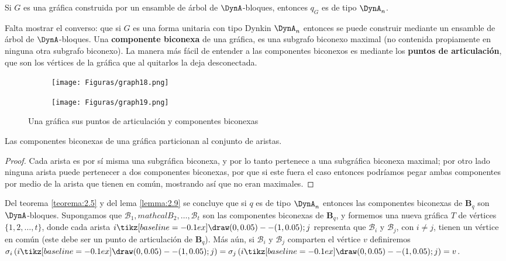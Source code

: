 \begin{lemma}
Si $G$ es una gráfica construida por un ensamble de árbol de $\DynA$-bloques, entonces $q_{G}$ es de tipo $\DynA_{n}$.
\label{lemma:2.10}
\end{lemma}
Falta mostrar el converso: que si $G$ es una forma unitaria con tipo Dynkin $\DynA_{n}$ entonces se puede construir mediante un ensamble de árbol de $\DynA$-bloques. Una \textbf{componente biconexa} de una gráfica, es una subgrafo biconexo maximal (no contenida propiamente en ninguna otra subgrafo biconexo). La manera más fácil de entender a las componentes biconexos es mediante los \textbf{puntos de articulación}, que son los vértices de la gráfica que al quitarlos la deja desconectada.\\

\begin{figure}[h]
    \begin{subfigure}[b]{0.5\textwidth}
      \begin{minipage}{7cm}
	\centering%
	    \texttt{[image: Figuras/graph18.png]}
	 \end{minipage}
	\caption{}
     \end{subfigure}
     \begin{subfigure}[b]{0.5\textwidth}
        \begin{minipage}{7cm}
       	 \centering%
	    \texttt{[image: Figuras/graph19.png]}
        \end{minipage}
        \caption{}
     \end{subfigure}
     \caption{Una gráfica sus puntos de articulación y componentes biconexas}
    \label{figura:2.9}
\end{figure}
\begin{lemma}
Las componentes biconexas de una gráfica particionan al conjunto de aristas.
\label{lemma:2.11}
\end{lemma}
\begin{proof}
Cada arista es por sí misma una subgráfica biconexa, y por lo tanto pertenece a una subgráfica biconexa maximal; por otro lado ninguna arista puede pertenecer a dos componentes biconexas, por que si este fuera el caso entonces podríamos pegar ambas componentes por medio de la arista que tienen en común, mostrando así que no eran maximales.
\end{proof}
Del teorema \ref{teorema:2.5} y del lema \ref{lemma:2.9} se concluye que si $q$ es de tipo $\DynA_{n}$ entonces las componentes biconexas de $\textbf{B}_{q}$ son $\DynA$-bloques. Supongamos que $\mathcal{B}_{1}, mathcal{B}_{2}, \ldots, \mathcal{B}_{t}$ son las componentes biconexas de $\textbf{B}_{q}$, y formemos una nueva gráfica $T$ de vértices $\{1, 2, \ldots, t\}$, donde cada arista $i \tikz[baseline=-0.1ex]\draw (0,0.05) -- (1,0.05); j$ representa que $\mathcal{B}_{i}$ y $\mathcal{B}_{j}$, con $i \neq j$, tienen un vértice en común (este debe ser un punto de articulación de $\textbf{B}_{q}$). Más aún, si $\mathcal{B}_{i}$ y $\mathcal{B}_{j}$ comparten el vértice $v$ definiremos $\sigma_{i}\left(i \tikz[baseline=-0.1ex]\draw (0,0.05) -- (1,0.05); j\right) = \sigma_{j}\left(i \tikz[baseline=-0.1ex]\draw (0,0.05) -- (1,0.05); j\right) = v$.\\
